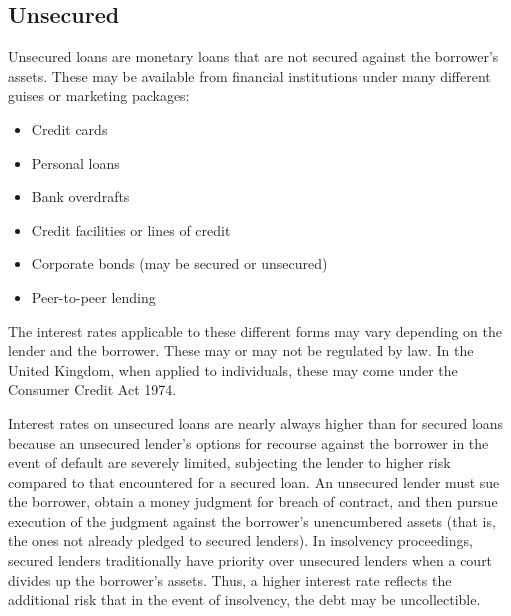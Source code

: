 \subsection{Unsecured}
\label{sss:unse-13e3}




Unsecured loans are monetary loans that are not secured against the borrower's assets.
These may be available from financial institutions under many different guises or
marketing packages:



\begin{itemize}
    \item Credit cards
    \item Personal loans
    \item Bank overdrafts
    \item Credit facilities or lines of credit
    \item Corporate bonds (may be secured or unsecured)
    \item Peer-to-peer lending
\end{itemize}

The interest rates applicable to these different forms may vary depending on the lender
and the borrower. These may or may not be regulated by law. In the United Kingdom, when
applied to individuals, these may come under the Consumer Credit Act 1974.



Interest rates on unsecured loans are nearly always higher than for secured loans because
an unsecured lender's options for recourse against the borrower in the event of default
are severely limited, subjecting the lender to higher risk compared to that encountered
for a secured loan. An unsecured lender must sue the borrower, obtain a money judgment for
breach of contract, and then pursue execution of the judgment against the borrower's
unencumbered assets (that is, the ones not already pledged to secured lenders). In
insolvency proceedings, secured lenders traditionally have priority over unsecured lenders
when a court divides up the borrower's assets. Thus, a higher interest rate reflects the
additional risk that in the event of insolvency, the debt may be uncollectible.




